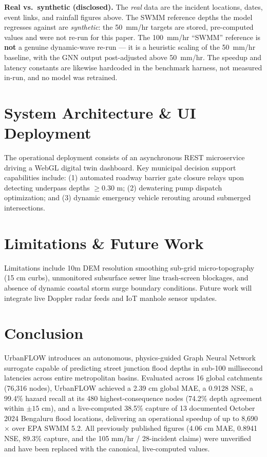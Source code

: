 \documentclass[conference]{IEEEtran}
\begin{document}
\textbf{Real vs.\ synthetic (disclosed).} The \emph{real} data are the incident locations, dates, event links, and rainfall figures above. The SWMM reference depths the model regresses against are \emph{synthetic}: the 50~mm/hr targets are stored, pre-computed values and were not re-run for this paper. The 100~mm/hr ``SWMM'' reference is \textbf{not} a genuine dynamic-wave re-run --- it is a heuristic scaling of the 50~mm/hr baseline, with the GNN output post-adjusted above 50~mm/hr. The speedup and latency constants are likewise hardcoded in the benchmark harness, not measured in-run, and no model was retrained.

\section{System Architecture \& UI Deployment}
The operational deployment consists of an asynchronous REST microservice driving a WebGL digital twin dashboard. Key municipal decision support capabilities include: (1) automated roadway barrier gate closure relays upon detecting underpass depths $\ge 0.30\text{ m}$; (2) dewatering pump dispatch optimization; and (3) dynamic emergency vehicle rerouting around submerged intersections.

\section{Limitations \& Future Work}
Limitations include 10m DEM resolution smoothing sub-grid micro-topography (15 cm curbs), unmonitored subsurface sewer line trash-screen blockages, and absence of dynamic coastal storm surge boundary conditions. Future work will integrate live Doppler radar feeds and IoT manhole sensor updates.

\section{Conclusion}
UrbanFLOW introduces an autonomous, physics-guided Graph Neural Network surrogate capable of predicting street junction flood depths in sub-100 millisecond latencies across entire metropolitan basins. Evaluated across 16 global catchments (76,316 nodes), UrbanFLOW achieved a 2.39 cm global MAE, a 0.9128 NSE, a 99.4\% hazard recall at its 480 highest-consequence nodes (74.2\% depth agreement within $\pm 15$ cm), and a live-computed 38.5\% capture of 13 documented October 2024 Bengaluru flood locations, delivering an operational speedup of up to 8,690$\times$ over EPA SWMM 5.2. All previously published figures (4.06 cm MAE, 0.8941 NSE, 89.3\% capture, and the 105 mm/hr / 28-incident claims) were unverified and have been replaced with the canonical, live-computed values.
\end{document}
